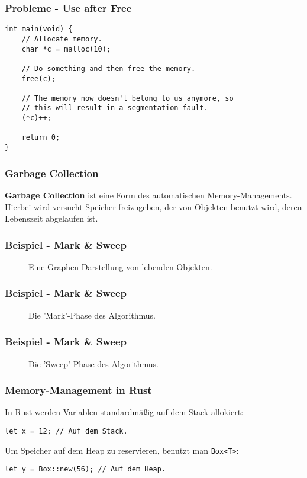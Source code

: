 \documentclass{beamer}
\begin{document}



\begin{frame}[fragile]
	\frametitle{Probleme - Use after Free}
	\begin{verbatim}
int main(void) {
	// Allocate memory.
	char *c = malloc(10);

	// Do something and then free the memory.
	free(c);

	// The memory now doesn't belong to us anymore, so
	// this will result in a segmentation fault.
	(*c)++;

	return 0;
}
	\end{verbatim}
\end{frame}
\begin{frame}
	\frametitle{Garbage Collection}
	\textbf{Garbage Collection} ist eine Form des automatischen Memory-Managements. Hierbei wird versucht Speicher freizugeben, der von Objekten benutzt wird, deren Lebenszeit abgelaufen ist.
\end{frame}
\begin{frame}
	\frametitle{Beispiel - Mark \& Sweep}
	\begin{figure}
		\centering
		\def\svgwidth{230pt}
		
		\caption{Eine Graphen-Darstellung von lebenden Objekten.}
	\end{figure}
\end{frame}
\begin{frame}
	\frametitle{Beispiel - Mark \& Sweep}
	\begin{figure}
		\centering
		\def\svgwidth{230pt}
		
		\caption{Die 'Mark'-Phase des Algorithmus.}
	\end{figure}
\end{frame}
\begin{frame}
	\frametitle{Beispiel - Mark \& Sweep}
	\begin{figure}
		\centering
		\def\svgwidth{230pt}
		
		\caption{Die 'Sweep'-Phase des Algorithmus.}
	\end{figure}
\end{frame}
\begin{frame}[fragile]
	\frametitle{Memory-Management in Rust}
	In Rust werden Variablen standardmäßig auf dem Stack allokiert:
	\begin{verbatim}
let x = 12; // Auf dem Stack.
	\end{verbatim}
	\vspace{1em}
	Um Speicher auf dem Heap zu reservieren, benutzt man \texttt{Box<T>}:
	\begin{verbatim}
let y = Box::new(56); // Auf dem Heap.
	\end{verbatim}
\end{frame}
\end{document}
